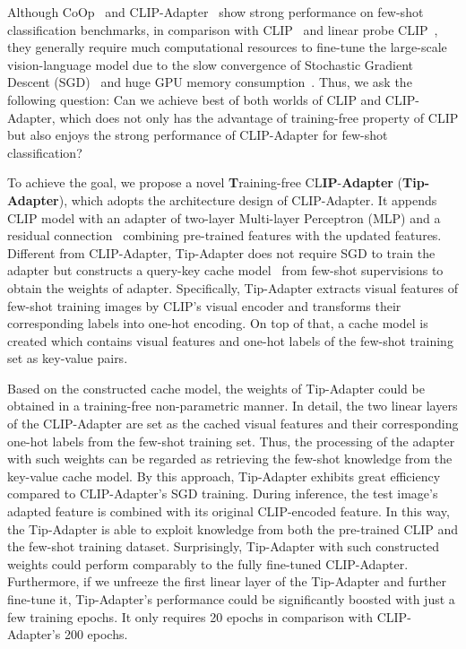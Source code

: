 \documentclass[10pt,twocolumn,letterpaper]{article}
\begin{document}
Although CoOp~\cite{zhou2021coop} and CLIP-Adapter~\cite{gao2021clip} show strong performance on few-shot classification benchmarks, in comparison with CLIP~\cite{radford2021learning} and linear probe CLIP~\cite{radford2021learning}, they generally require much computational resources to fine-tune the large-scale vision-language model due to the slow convergence of Stochastic Gradient Descent (SGD)~\cite{kingma2014adam,loshchilov2017decoupled} and huge GPU memory consumption~\cite{rumelhart1985learning}.
Thus, we ask the following question: {Can we achieve best of both worlds of CLIP and CLIP-Adapter, which does not only has the advantage of training-free property of CLIP but also enjoys the strong performance of CLIP-Adapter
for few-shot classification?}

To achieve the goal, we propose a novel \textbf{T}raining-free CL\textbf{IP}-\textbf{Adapter} (\textbf{Tip-Adapter}), which adopts the architecture design of CLIP-Adapter. It appends CLIP model with an adapter of two-layer Multi-layer Perceptron (MLP) and a residual connection~\cite{he2016deep} combining pre-trained features with the updated features. Different from CLIP-Adapter, Tip-Adapter does not require SGD to train the adapter but constructs a query-key cache model~\cite{khandelwal2019generalization,orhan2018simple,grave2017unbounded} from few-shot supervisions to obtain the weights of adapter. Specifically, Tip-Adapter extracts visual features of few-shot training images by CLIP's visual encoder and transforms their corresponding labels into one-hot encoding. On top of that, a cache model is created which contains visual features and one-hot labels of the few-shot training set as key-value pairs.

Based on the constructed cache model, the weights of Tip-Adapter could be obtained in a training-free non-parametric manner. In detail, the two linear layers of the CLIP-Adapter are set as the cached visual features and their corresponding one-hot labels from the few-shot training set. Thus, the processing of the adapter with such weights can be regarded as retrieving the few-shot knowledge from the key-value cache model. By this approach, Tip-Adapter exhibits great efficiency compared to CLIP-Adapter's SGD training.
During inference, the test image's adapted feature is combined with its original CLIP-encoded feature. In this way, the Tip-Adapter is able to exploit knowledge from both the pre-trained CLIP and the few-shot training dataset.
Surprisingly, Tip-Adapter with such constructed weights could perform comparably to the fully fine-tuned CLIP-Adapter. 
Furthermore, if we unfreeze the first linear layer of the Tip-Adapter and further fine-tune it, Tip-Adapter's performance could be significantly boosted with just a few training epochs. It only requires 20 epochs in comparison with CLIP-Adapter's 200 epochs. 
\end{document}
